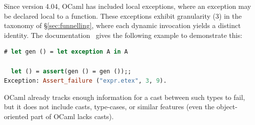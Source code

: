 Since version 4.04, OCaml has included local exceptions, where an exception may be declared local to a function.
These exceptions exhibit granularity (3) in the taxonomy of \S\ref{sec:funnelling}, where each dynamic invocation yields a distinct identity. The documentation~\cite[\S11.7]{ocamldocs} gives the following example to demonstrate this:
\begin{lstlisting}[language=Caml]
# let gen () = let exception A in A

  let () = assert(gen () = gen ());;
Exception: Assert_failure ("expr.etex", 3, 9).
\end{lstlisting}
OCaml already tracks enough information for a cast between such types to fail, but it does not include casts, type-cases, or similar features (even the object-oriented part of OCaml lacks casts).

